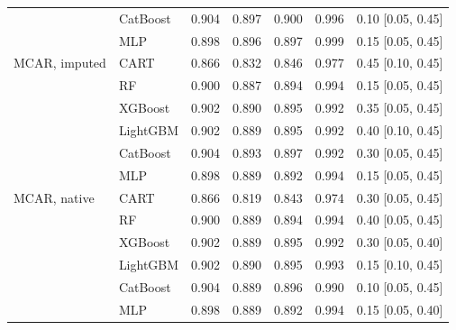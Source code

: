 \documentclass[pdflatex,sn-mathphys]{sn-jnl}
\theoremstyle{thmstyleone}
\begin{document}
\begin{table}[htbp]
\begin{tabular}{@{}llrrrrl@{}}
 & CatBoost & 0.904 & 0.897 & 0.900 & 0.996 & 0.10 [0.05, 0.45] \\
 & MLP & 0.898 & 0.896 & 0.897 & 0.999 & 0.15 [0.05, 0.45] \\
\midrule
MCAR, imputed & CART & 0.866 & 0.832 & 0.846 & 0.977 & 0.45 [0.10, 0.45] \\
 & RF & 0.900 & 0.887 & 0.894 & 0.994 & 0.15 [0.05, 0.45] \\
 & XGBoost & 0.902 & 0.890 & 0.895 & 0.992 & 0.35 [0.05, 0.45] \\
 & LightGBM & 0.902 & 0.889 & 0.895 & 0.992 & 0.40 [0.10, 0.45] \\
 & CatBoost & 0.904 & 0.893 & 0.897 & 0.992 & 0.30 [0.05, 0.45] \\
 & MLP & 0.898 & 0.889 & 0.892 & 0.994 & 0.15 [0.05, 0.45] \\
\midrule
MCAR, native & CART & 0.866 & 0.819 & 0.843 & 0.974 & 0.30 [0.05, 0.45] \\
 & RF & 0.900 & 0.889 & 0.894 & 0.994 & 0.40 [0.05, 0.45] \\
 & XGBoost & 0.902 & 0.889 & 0.895 & 0.992 & 0.30 [0.05, 0.40] \\
 & LightGBM & 0.902 & 0.890 & 0.895 & 0.993 & 0.15 [0.10, 0.45] \\
 & CatBoost & 0.904 & 0.889 & 0.896 & 0.990 & 0.10 [0.05, 0.45] \\
 & MLP & 0.898 & 0.889 & 0.892 & 0.994 & 0.15 [0.05, 0.40] \\
\bottomrule
\end{tabular}
\end{table}
\end{document}
